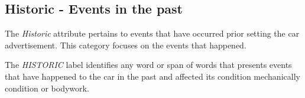 \documentclass[11pt]{article}
\begin{document}

\subsection*{Historic - Events in the past}
The \textit{Historic} attribute pertains to events that have occurred prior setting the car advertisement. This category focuses on the events that happened.


\begin{tcolorbox}[colback=gray!5!white, colframe=gray!75!black, title=Definition]
The \textit{HISTORIC} label identifies any word or span of words that presents events that have happened to the car in the past and affected its condition mechanically condition or bodywork.


\end{tcolorbox}
\end{document}
